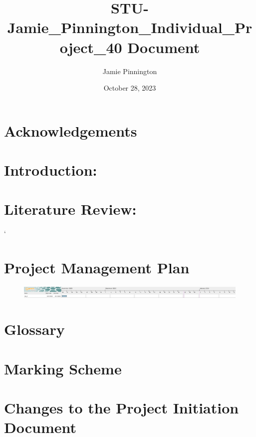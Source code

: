 \documentclass[journal, draftcls]{IEEEtran}
\title{STU-Jamie_Pinnington_Individual_Project_40 Document}
\author{Jamie Pinnington}
\date{October 28, 2023}
\begin{document}


\clearpage %

\begin{abstract}
\end{abstract}

\section*{Acknowledgements}
\clearpage %

\tableofcontents
\clearpage %

\listoffigures
\clearpage %

\listoftables
\clearpage %

\section{Introduction:}

\section{Literature Review:}


\printbibliography


\newpage
\onecolumn
\begin{landscape}
    `    \section{Project Management Plan}
    \begin{figure}[ht]
        \centering
        \includegraphics[width=1\textwidth]{gantt_chart.png}
        \label{fig:Gantt Chart}
    \end{figure}
\end{landscape}

\section{Glossary}
\section{Marking Scheme}
\section{Changes to the Project Initiation Document}
\end{document}
